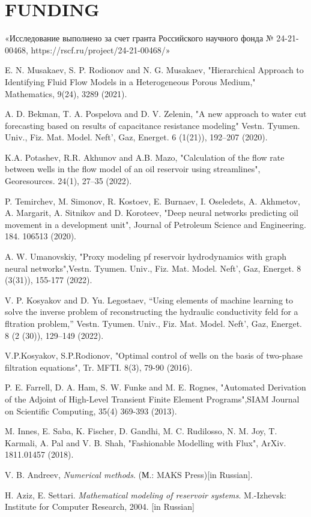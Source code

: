 \documentclass{article}
\begin{document}
\section{FUNDING}
«Исследование выполнено за счет гранта Российского научного фонда № 24-21-00468,
 https://rscf.ru/project/24-21-00468/»
 
 \begin{thebibliography}{20}
	
 E. N. Musakaev, S. P. Rodionov and N. G. Musakaev, "Hierarchical Approach to Identifying Fluid Flow Models in a Heterogeneous Porous Medium," Mathematics, 9(24), 3289 (2021).

 A. D. Bekman, T. A. Pospelova and D. V. Zelenin,  "A new approach to water cut forecasting based on results of capacitance resistance modeling" Vestn. Tyumen. Univ., Fiz. Mat. Model. Neft’, Gaz, Energet. 6 (1(21)), 192–207 (2020).

 K.A. Potashev, R.R. Akhunov and  A.B. Mazo, "Calculation of the flow rate between wells in the flow model of an oil reservoir using streamlines", Georesources. 24(1), 27–35 (2022).

  P. Temirchev, M. Simonov, R. Kostoev, E. Burnaev, I. Oseledets, A. Akhmetov, A. Margarit, A. Sitnikov and D. Koroteev, "Deep neural networks predicting oil movement in a development unit", Journal of Petroleum Science and Engineering. 184. 106513 (2020).

 A. W. Umanovskiy, "Proxy modeling pf reservoir hydrodynamics with graph neural networks",Vestn. Tyumen. Univ., Fiz. Mat. Model. Neft’, Gaz, Energet. 8 (3(31)), 155-177 (2022).

 V. P. Kosyakov and D. Yu. Legostaev, “Using elements of machine learning to solve the inverse problem of reconstructing the hydraulic conductivity feld for a fltration problem,” Vestn. Tyumen. Univ., Fiz. Mat. Model. Neft’, Gaz, Energet. 8 (2 (30)), 129–149 (2022).

 V.P.Kosyakov, S.P.Rodionov, "Optimal control of wells on the basis of two-phase filtration equations",  Tr. MFTI. 8(3), 79-90 (2016).

 P. E. Farrell, D. A. Ham, S. W. Funke and M. E. Rognes, "Automated Derivation of the Adjoint of High-Level Transient Finite Element Programs",SIAM Journal on Scientific Computing, 35(4) 369-393 (2013).

  M. Innes, E. Saba, K. Fischer, D. Gandhi, M. C. Rudilosso, N. M. Joy, T. Karmali, A. Pal and V. B. Shah, "Fashionable Modelling with Flux", ArXiv. 1811.01457 (2018).

 V. B. Andreev, \textit{Numerical methods}. (М.: MAKS Press)[in Russian].

 H. Aziz, E. Settari. \textit{Mathematical modeling of reservoir systems}.  M.-Izhevsk: Institute for Computer Research, 2004. [in Russian]


\end{thebibliography}
\end{document}
